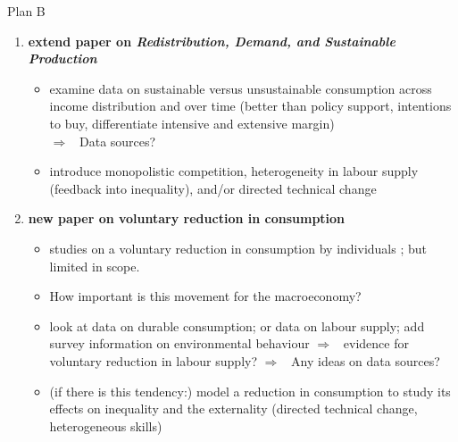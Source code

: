 \documentclass[11pt,aspectratio=169]{beamer}
\newcommand{\ar}{$\Rightarrow$ \ }
\begin{document}
\begin{frame}{Plan B}
	\pause
	\vspace{-3mm}
\begin{enumerate}
	\item \textbf{extend paper on \textit{Redistribution, Demand, and Sustainable Production}}
	\begin{itemize}
		\item<+-> examine data on sustainable versus unsustainable consumption across income distribution and over time \footnotesize{(better than policy support, intentions to buy, differentiate intensive and extensive margin)} \\
		\alert{\ar Data sources?}
\item<+-> \normalsize introduce monopolistic competition, heterogeneity in labour supply \footnotesize{(feedback into inequality)}, \normalsize and/or directed technical change %
	\end{itemize}
\vspace{2mm}
\item<+-> \textbf{new paper on voluntary reduction in consumption} 
\begin{itemize}
	\item<+-> studies on a voluntary reduction in consumption by individuals \citep{Alexander2012TheContext}; but limited in scope. 
	\item<+-> How important is this movement for the macroeconomy?
\item<+-> look at data on durable consumption; or data on labour supply; add survey information on environmental behaviour \ar evidence for voluntary reduction in labour supply?
\alert{\ar Any ideas on data sources?}
\item<+-> (if there is this tendency:) model a reduction in consumption to study its effects on inequality and the externality \small{(directed technical change, heterogeneous skills)}
\end{itemize}
\end{enumerate}
\end{frame}
\end{document}
